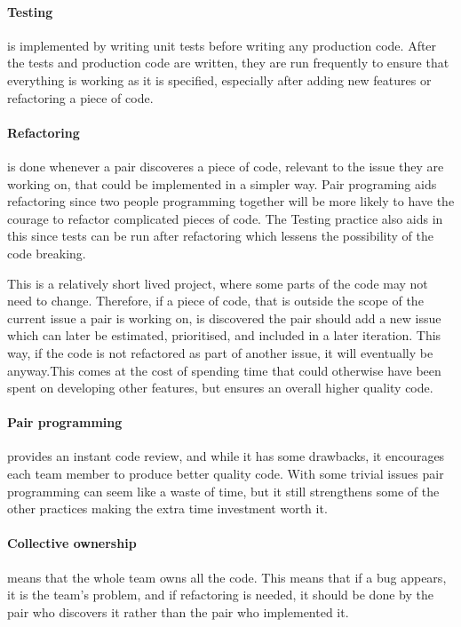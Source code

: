 \paragraph{Testing} is implemented by writing unit tests before writing any production code. After the tests and production code are written, they are run frequently to ensure that everything is working as it is specified, especially after adding new features or refactoring a piece of code.

\paragraph{Refactoring} is done whenever a pair discoveres a piece of code, relevant to the issue they are working on, that could be implemented in a simpler way. Pair programing aids refactoring since two people programming together will be more likely to have the courage to refactor complicated pieces of code. The Testing practice also aids in this since tests can be run after refactoring which lessens the possibility of the code breaking.

This is a relatively short lived project, where some parts of the code may not need to change. Therefore, if a piece of code, that is outside the scope of the current issue a pair is working on, is discovered the pair should add a new issue which can later be estimated, prioritised, and included in a later iteration. This way, if the code is not refactored as part of another issue, it will eventually be anyway.This comes at the cost of spending time that could otherwise have been spent on developing other features, but ensures an overall higher quality code. 

\paragraph{Pair programming} provides an instant code review, and while it has some drawbacks, it encourages each team member to produce better quality code. With some trivial issues pair programming can seem like a waste of time, but it still strengthens some of the other practices making the extra time investment worth it.  

\paragraph{Collective ownership} means that the whole team owns all the code. This means that if a bug appears, it is the team's problem, and if refactoring is needed, it should be done by the pair who discovers it rather than the pair who implemented it.

